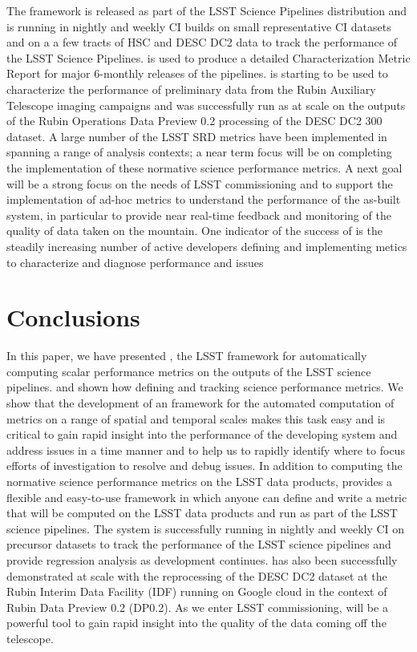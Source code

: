 The \faro framework is released as part of the LSST Science Pipelines distribution and is running in 
nightly and weekly CI builds on small representative CI datasets and on a a few tracts of HSC and DESC DC2 data to track the performance of the LSST Science Pipelines. 
\faro is used to produce a detailed Characterization Metric Report for major 6-monthly releases of the pipelines. 
\faro is starting to be used to characterize the performance of preliminary data from the Rubin Auxiliary Telescope imaging campaigns and was successfully run as at scale on the outputs of the Rubin Operations Data Preview 0.2 processing of the DESC DC2 300 \degsq dataset.
A large number of the LSST SRD metrics have been implemented in \faro spanning a range of analysis contexts; a near term focus will be on completing the implementation of these normative science performance metrics. 
A next goal will be a strong focus on the needs of LSST commissioning and to support the implementation of ad-hoc metrics to understand the performance of the as-built system, in particular to provide near real-time feedback and monitoring of the quality of data taken on the mountain. 
One indicator of the success of \faro is the steadily increasing number of active developers defining and implementing metics to characterize and diagnose performance and issues 

\section{Conclusions} \label{sec:conclusions}

In this paper, we have presented \faro, the LSST framework for automatically computing scalar performance metrics on the outputs of the LSST science pipelines. 
and shown how defining and tracking science performance  metrics.
We show that the development of an framework for the automated computation of metrics on a range of spatial and temporal scales makes this task easy and is critical to gain rapid insight into the performance of the developing system and address issues in a time manner and to help us to rapidly identify where to focus efforts of investigation to resolve and debug issues. 
In addition to computing the normative science performance metrics on the LSST data products, \faro provides a flexible and easy-to-use framework in which anyone can define and write a metric that will be computed on the LSST data products and run as part of the LSST science pipelines. 
The system is successfully running in nightly and weekly CI on precursor datasets to track the performance of the LSST science pipelines and provide regression analysis as development continues. 
\faro has also been successfully demonstrated at scale with the reprocessing of the DESC DC2 dataset \cite{2021ApJS..253...31L} at the Rubin Interim Data Facility (IDF) running on Google cloud \cite{2021arXiv211115030O} in the context of Rubin Data Preview 0.2 (DP0.2)\cite{RTN-001}. 
As we enter LSST commissioning, \faro will be a powerful tool to gain rapid insight into the quality of the data coming off the telescope. 

